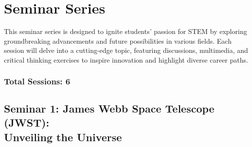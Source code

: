
\section{Seminar Series}
\addtocounter{section}{5}%

\begin{tcolorbox}[boxstyle, title={Module Overview}]
    This seminar series is designed to ignite students' passion for STEM by exploring groundbreaking advancements and future possibilities in various fields. Each session will delve into a cutting-edge topic, featuring discussions, multimedia, and critical thinking exercises to inspire innovation and highlight diverse career paths.
\end{tcolorbox}

\subsubsection*{Total Sessions: 6}

\subsection{\texorpdfstring{Seminar 1: James Webb Space Telescope (JWST): \\ Unveiling the Universe}
                              {Seminar 1: James Webb Space Telescope (JWST): Unveiling the Universe}}

